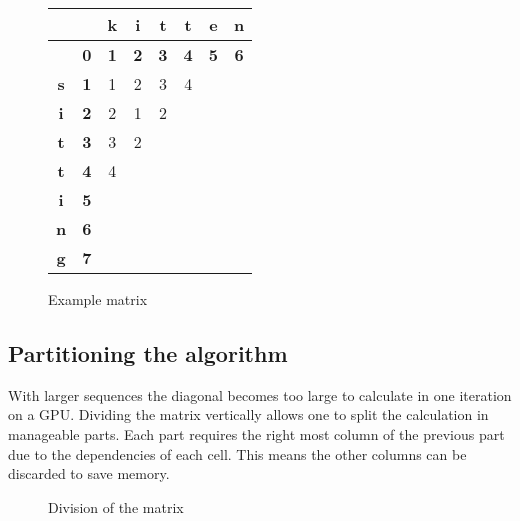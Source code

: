 {\newcommand\C[0]{\cellcolor{gray}}
\begin{figure}
\centering \large
\begin{tabular}{|c|c||c|c|c|c|c|c|} \hline
           &            & \textbf{k} & \textbf{i} & \textbf{t} & \textbf{t} & \textbf{e} & \textbf{n} \\ \hline
           & \textbf{0} & \textbf{1} & \textbf{2} & \textbf{3} & \textbf{4} & \textbf{5} & \textbf{6} \\ \hline \hline
\textbf{s} & \textbf{1} & 1          & 2          & 3          & 4          & \C         &            \\ \hline
\textbf{i} & \textbf{2} & 2          & 1          & 2          & \C         &            &            \\ \hline
\textbf{t} & \textbf{3} & 3          & 2          & \C         &            &            &            \\ \hline
\textbf{t} & \textbf{4} & 4          & \C         &            &            &            &            \\ \hline
\textbf{i} & \textbf{5} & \C         &            &            &            &            &            \\ \hline
\textbf{n} & \textbf{6} &            &            &            &            &            &            \\ \hline
\textbf{g} & \textbf{7} &            &            &            &            &            &            \\ \hline
\end{tabular}
\caption{Example matrix} \label{diagonal}
\end{figure}
}

\subsection{Partitioning the algorithm} \label{partitioning}
With larger sequences the diagonal becomes too large to calculate in one iteration on a GPU.
Dividing the matrix vertically allows one to split the calculation in manageable parts.
Each part requires the right most column of the previous part due to the dependencies of each cell.
This means the other columns can be discarded to save memory.

\begin{figure}
    \centering
    
    \caption{Division of the matrix} \label{division}
\end{figure}

